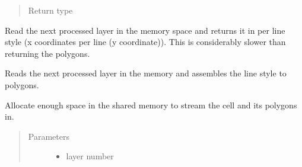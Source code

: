 \documentclass[a4paper,10pt,english]{sphinxmanual}
\begin{document}
\begin{fulllineitems}
\begin{fulllineitems}
\begin{quote}
\begin{description}
\item[{Return type}] \leavevmode
{}%
\begin{footnote}[13]\sphinxAtStartFootnote
{}
%
\end{footnote}

\end{description}\end{quote}

\end{fulllineitems}


\begin{fulllineitems}
\label{\detokenize{drc/drc:kppc.drc.PyCleanerMaster.get_layer}}
Read the next processed layer in the memory space and returns it in per line style (x coordinates per line (y coordinate)). This is considerably slower than returning the polygons.

\end{fulllineitems}


\begin{fulllineitems}
\label{\detokenize{drc/drc:kppc.drc.PyCleanerMaster.polygons}}
Reads the next processed layer in the memory and assembles the line style to polygons.

\end{fulllineitems}


\begin{fulllineitems}
\label{\detokenize{drc/drc:kppc.drc.PyCleanerMaster.set_box}}
Allocate enough space in the shared memory to stream the cell and its polygons in.
\begin{quote}\begin{description}
\item[{Parameters}] \leavevmode\begin{itemize}
\item {} 
 \textendash{} layer number


\end{itemize}
\end{description}
\end{quote}
\end{fulllineitems}
\end{fulllineitems}
\end{document}
